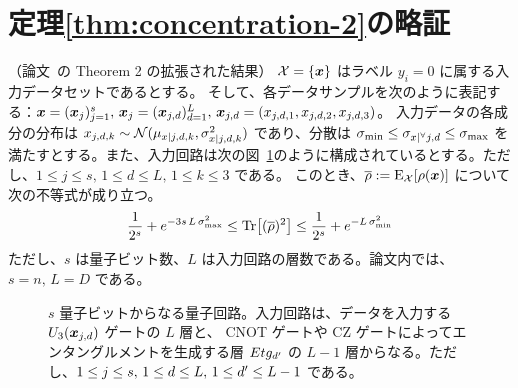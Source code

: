 \section{定理\ref{thm:concentration-2}の略証}\label{sec:prf-concentration-2}
\begin{screen}
    \begin{theorem}
        （論文~\cite{li2022concentration}の Theorem 2 の拡張された結果）
        $\mathcal{X} = \{\boldsymbol{x}\}$ はラベル $y_i=0$ に属する入力データセットであるとする。
        そして、各データサンプルを次のように表記する：$\boldsymbol{x} = (\boldsymbol{x}_{j})_{j=1}^s,\, \boldsymbol{x}_{j} = (\boldsymbol{x}_{j,d})_{d=1}^L,\,\boldsymbol{x}_{j,d} = (x_{j,d,1},x_{j,d,2},x_{j,d,3})$。
        入力データの各成分の分布は $x_{j,d,k} \sim \mathcal{N}(\mu_{x|j,d,k}, \sigma_{x|j,d,k}^2)$ であり、分散は $\sigma_{\min} \leq \sigma_{x|{}^\forall j,d} \leq \sigma_{\max}$ を満たすとする。また、入力回路は次の図~\ref{fig:circuit-concentration-2_}のように構成されているとする。ただし、$1\leq j\leq s,\, 1\leq d\leq L,\,1\leq k\leq 3$ である。
        このとき、$\overline{\rho} := \operatorname{E}_{\mathcal{X}}[\rho(\boldsymbol{x})]$ について次の不等式が成り立つ。
        \begin{align}
            \frac{1}{2^s} + e^{-3s\,L\,\sigma_{\max}^2}
            \leq \Tr[(\overline{\rho})^2]
            \leq \frac{1}{2^s} + e^{-L\,\sigma_{\min}^2}
        \end{align}
        ただし、$s$ は量子ビット数、$L$ は入力回路の層数である。論文内では、$s = n,\,L = D$ である。
    \end{theorem}
\end{screen}

\begin{figure}[H]
    \centering
    \caption{$s$ 量子ビットからなる量子回路。入力回路は、データを入力する $U_3(\boldsymbol{x}_{j,d})$ ゲートの $L$ 層と、 CNOT ゲートや CZ ゲートによってエンタングルメントを生成する層 $Etg_{d^\prime}$ の $L-1$ 層からなる。ただし、$1\leq j\leq s,\, 1\leq d\leq L,\, 1\leq d^\prime\leq L-1$ である。}
    \label{fig:circuit-concentration-2_}
\end{figure}


